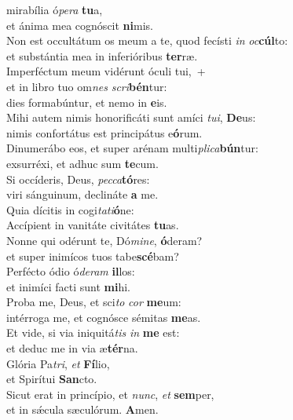\oddverse  mirabília ó\textit{pe}\textit{ra} \textbf{tu}a,~\*\\
\oddverse et ánima mea cognóscit \textbf{ni}mis.\\
\evenverse Non est occultátum os meum a te, quod fecísti \textit{in} \textit{oc}\textbf{cúl}to:~\*\\
\evenverse et substántia mea in inferióribus \textbf{ter}ræ.\\
\oddverse Imperféctum meum vidérunt óculi tui,~+\\
\oddverse  et in libro tuo om\textit{nes} \textit{scri}\textbf{bén}tur:~\*\\
\oddverse dies formabúntur, et nemo in \textbf{e}is.\\
\evenverse Mihi autem nimis honorificáti sunt amíci \textit{tu}\textit{i}, \textbf{De}us:~\*\\
\evenverse nimis confortátus est principátus e\textbf{ó}rum.\\
\oddverse Dinumerábo eos, et super arénam multi\textit{pli}\textit{ca}\textbf{bún}tur:~\*\\
\oddverse exsurréxi, et adhuc sum \textbf{te}cum.\\
\evenverse Si occíderis, Deus, \textit{pec}\textit{ca}\textbf{tó}res:~\*\\
\evenverse viri sánguinum, declináte \textbf{a} me.\\
\oddverse Quia dícitis in cogi\textit{ta}\textit{ti}\textbf{ó}ne:~\*\\
\oddverse Accípient in vanitáte civitátes \textbf{tu}as.\\
\evenverse Nonne qui odérunt te, Dó\textit{mi}\textit{ne}, \textbf{ó}deram?~\*\\
\evenverse et super inimícos tuos tabe\textbf{scé}bam?\\
\oddverse Perfécto ódio ó\textit{de}\textit{ram} \textbf{il}los:~\*\\
\oddverse et inimíci facti sunt \textbf{mi}hi.\\
\evenverse Proba me, Deus, et sci\textit{to} \textit{cor} \textbf{me}um:~\*\\
\evenverse intérroga me, et cognósce sémitas \textbf{me}as.\\
\oddverse Et vide, si via iniquitá\textit{tis} \textit{in} \textbf{me} est:~\*\\
\oddverse et deduc me in via æ\textbf{tér}na.\\
\evenverse Glória Pa\textit{tri}, \textit{et} \textbf{Fí}lio,~\*\\
\evenverse et Spirítui \textbf{San}cto.\\
\oddverse Sicut erat in princípio, et \textit{nunc}, \textit{et} \textbf{sem}per,~\*\\
\oddverse et in sǽcula sæculórum. \textbf{A}men.\\

